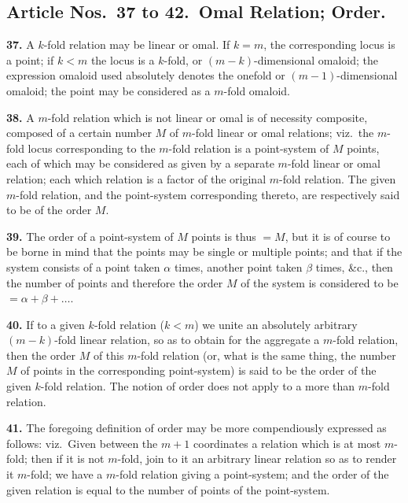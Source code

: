 \documentclass[11pt,a4paper]{article}
\theoremstyle{definition}
\begin{document}
\subsection*{Article Nos.\ 37 to 42.\ Omal Relation; Order.}

\setcounter{page}{461}

\noindent\textbf{37.} A $k$-fold relation may be linear or omal. If $k=m$, the corresponding locus is a point; if $k<m$ the locus is a $k$-fold, or $(m-k)$-dimensional omaloid; the expression omaloid used absolutely denotes the onefold or $(m-1)$-dimensional omaloid; the point may be considered as a $m$-fold omaloid.

\noindent\textbf{38.} A $m$-fold relation which is not linear or omal is of necessity composite, composed of a certain number $M$ of $m$-fold linear or omal relations; viz.\ the $m$-fold locus corresponding to the $m$-fold relation is a point-system of $M$ points, each of which may be considered as given by a separate $m$-fold linear or omal relation; each which relation is a factor of the original $m$-fold relation. The given $m$-fold relation, and the point-system corresponding thereto, are respectively said to be of the order $M$.

\noindent\textbf{39.} The order of a point-system of $M$ points is thus $=M$, but it is of course to be borne in mind that the points may be single or multiple points; and that if the system consists of a point taken $\alpha$ times, another point taken $\beta$ times, \&c., then the number of points and therefore the order $M$ of the system is considered to be $=\alpha+\beta+\ldots$.

\noindent\textbf{40.} If to a given $k$-fold relation ($k<m$) we unite an absolutely arbitrary $(m-k)$-fold linear relation, so as to obtain for the aggregate a $m$-fold relation, then the order $M$ of this $m$-fold relation (or, what is the same thing, the number $M$ of points in the corresponding point-system) is said to be the order of the given $k$-fold relation. The notion of order does not apply to a more than $m$-fold relation.

\noindent\textbf{41.} The foregoing definition of order may be more compendiously expressed as follows: viz.\ Given between the $m+1$ coordinates a relation which is at most $m$-fold; then if it is not $m$-fold, join to it an arbitrary linear relation so as to render it $m$-fold; we have a $m$-fold relation giving a point-system; and the order of the given relation is equal to the number of points of the point-system.
\end{document}
